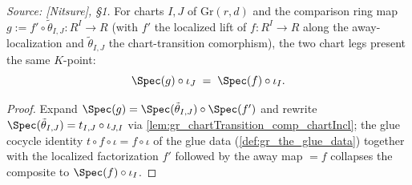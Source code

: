 \begin{lemma}

  \label{lem:gr_existence_chart_kpoint_eq}
  \textit{Source: [Nitsure], \S 1.}
  For charts \(I, J\) of \(\mathrm{Gr}(r,d)\) and the comparison ring map
  \(g := f' \circ \tilde\theta_{I,J} : R^I \to R\) (with \(f'\) the localized lift of
  \(f : R^I \to R\) along the away-localization and \(\tilde\theta_{I,J}\) the chart-transition
  comorphism), the two chart legs present the same \(K\)-point:
  \[
    \Spec(g) \circ \iota_J \;=\; \Spec(f) \circ \iota_I .
  \]
\end{lemma}
\begin{proof}
  \leanok
  Expand \(\Spec(g) = \Spec(\tilde\theta_{I,J}) \circ \Spec(f')\) and rewrite
  \(\Spec(\tilde\theta_{I,J}) = t_{I,J} \circ \iota_{J,I}\) via
  \cref{lem:gr_chartTransition_comp_chartIncl}; the glue cocycle identity
  \(t \circ f \circ \iota = f \circ \iota\) of the glue data (\cref{def:gr_the_glue_data}) together with
  the localized factorization \(f' \) followed by the away map \(= f\) collapses the composite to
  \(\Spec(f) \circ \iota_I\).
\end{proof}

